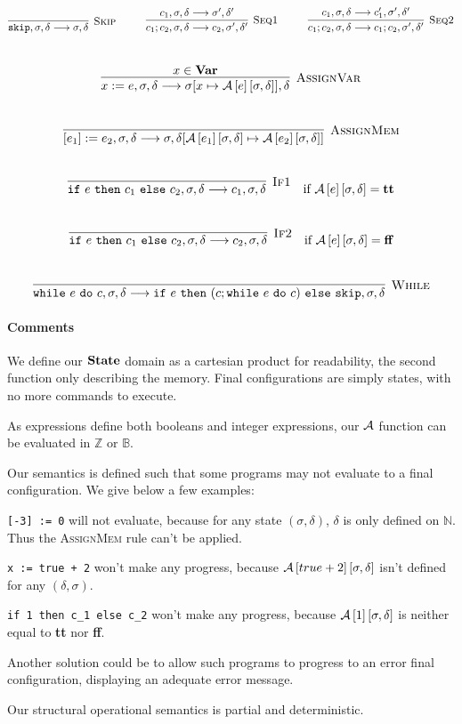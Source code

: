 \[
	\Rule{Skip}{\texttt{skip}, \sigma, \delta \longrightarrow \sigma, \delta}{} \hspace*{1cm}
	\Rule{Seq1}{c_1 ; c_2, \sigma, \delta \longrightarrow c_2, \sigma', \delta'}{c_1, \sigma, \delta \longrightarrow \sigma', \delta'} \hspace*{1cm}
	\Rule{Seq2}{c_1 ; c_2, \sigma, \delta \longrightarrow c_1 ; c_2, \sigma', \delta'}{c_1, \sigma, \delta \longrightarrow c_1', \sigma', \delta'}
\]
\\
\[
	\Rule{AssignVar}{x := e, \sigma, \delta \longrightarrow \sigma[x \mapsto \Aa{e}{\sigma, \delta}], \delta}{x \in \var{}}
\]
\\
\[
	\Rule{AssignMem}{[e_1] := e_2, \sigma, \delta \longrightarrow \sigma, \delta[\Aa{e_1}{\sigma, \delta} \mapsto \Aa{e_2}{\sigma, \delta}]}{}
\]
\\
\[
	\Rule{If1}{\texttt{if}~e~\texttt{then}~c_1~\texttt{else}~c_2, \sigma, \delta \longrightarrow c_1, \sigma, \delta}{} \quad \text{if $\Aa{e}{\sigma, \delta} = \true{}$}
\]
\\
\[
	\Rule{If2}{\texttt{if}~e~\texttt{then}~c_1~\texttt{else}~c_2, \sigma, \delta \longrightarrow c_2, \sigma, \delta}{} \quad \text{if $\Aa{e}{\sigma, \delta} = \false{}$}
\]
\\
\[
	\Rule{While}{\texttt{while}~e~\texttt{do}~c, \sigma, \delta \longrightarrow \texttt{if}~e~\texttt{then}~(c; \texttt{while}~e~\texttt{do}~c)~\texttt{else}~\texttt{skip}, \sigma, \delta}{} 
\]

\paragraph{Comments}
We define our $\mathbf{State}$ domain as a cartesian product for readability, the second function only describing the memory.
Final configurations are simply states, with no more commands to execute.

As expressions define both booleans and integer expressions, our $\mathcal{A}{}$ function can be evaluated in $\mathbb{Z}$ or $\mathbb{B}$.

Our semantics is defined such that some programs may not evaluate to a final configuration. We give below a few examples:

\texttt{[-3] := 0} will not evaluate, because for any state $(\sigma,\delta)$, $\delta$ is only defined on $\mathbb{N}$. Thus the \textsc{AssignMem} rule can't be applied.

\texttt{x := true + 2} won't make any progress, because $\mathcal{A}\left[true + 2\right]\left[\sigma,\delta\right]$ isn't defined for any $(\delta,\sigma)$.

\texttt{if 1 then c\_1 else c\_2} won't make any progress, because $\mathcal{A}\left[1\right]\left[\sigma,\delta\right]$ is neither equal to \textbf{tt} nor \textbf{ff}.

Another solution could be to allow such programs to progress to an error final configuration, displaying an adequate error message.

Our structural operational semantics is partial and deterministic.
